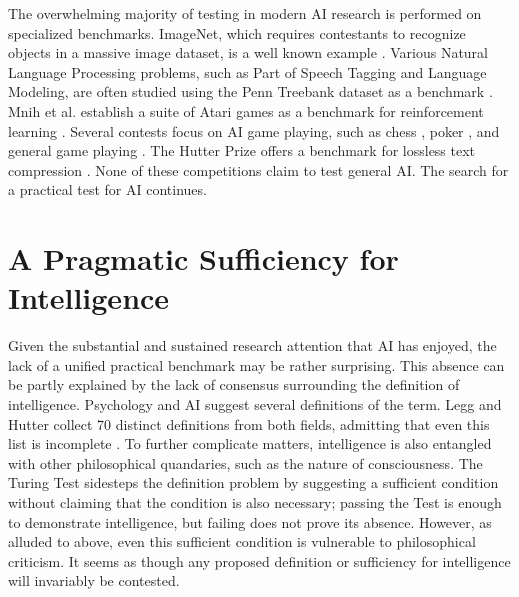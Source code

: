 The overwhelming majority of testing in modern AI research is performed on specialized benchmarks. ImageNet, which requires contestants to recognize objects in a massive image dataset, is a well known example \cite{russakovsky2015imagenet}. Various Natural Language Processing problems, such as Part of Speech Tagging and Language Modeling, are often studied using the Penn Treebank dataset as a benchmark \cite{marcus1993building}. Mnih et al. establish a suite of Atari games as a benchmark for reinforcement learning \cite{mnih2013playing}. Several contests focus on AI game playing, such as chess \cite{hayes1976world}, poker \cite{littman20062006}, and general game playing \cite{genesereth2005general}. The Hutter Prize offers a benchmark for lossless text compression \cite{mahoney2006rationale}. None of these competitions claim to test general AI. The search for a practical test for AI continues. 

\section{A Pragmatic Sufficiency for Intelligence}

Given the substantial and sustained research attention that AI has enjoyed, the lack of a unified practical benchmark may be rather surprising. This absence can be partly explained by the lack of consensus surrounding the definition of intelligence. Psychology and AI suggest several definitions of the term. Legg and Hutter collect 70 distinct definitions from both fields, admitting that even this list is incomplete \cite{legg2007collection}. To further complicate matters, intelligence is also entangled with other philosophical quandaries, such as the nature of consciousness. The Turing Test sidesteps the definition problem by suggesting a sufficient condition without claiming that the condition is also necessary; passing the Test is enough to demonstrate intelligence, but failing does not prove its absence. However, as alluded to above, even this sufficient condition is vulnerable to philosophical criticism. It seems as though any proposed definition or sufficiency for intelligence will invariably be contested.

